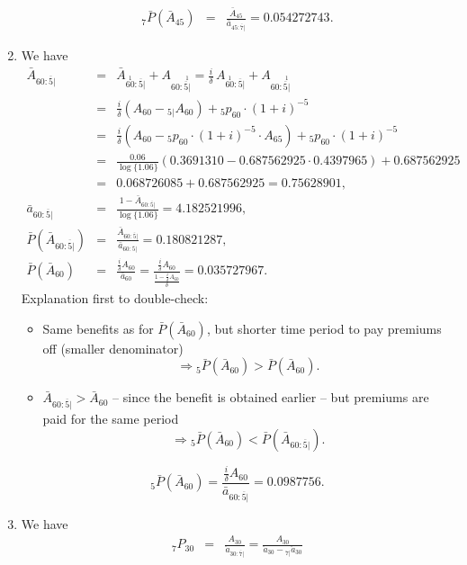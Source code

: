 \documentclass[11pt,fleqn,oneside]{book}
\begin{document}
\begin{enumerate}
\begin{eqnarray*}
{_7\bar{P}\left(\bar{A}_{45}\right)} &=& \frac{\bar{A}_{45}}{\bar{a}_{45:\overline{7}|}} = 0.054272743.
\end{eqnarray*}
\item We have
\begin{eqnarray*}
\bar{A}_{60:\overline{5}|} &=& \bar{A}_{\stackrel{1}{60}:{\overline{5}|}} + A_{60:\stackrel{1}{\overline{5}|}}
=  \frac{i}{\delta}\, A_{\stackrel{1}{60}:{\overline{5}|}} + A_{60:\stackrel{1}{\overline{5}|}}\\
&=& \frac{i}{\delta}\left(A_{60} -{_{5|}A_{60}}\right) + {_5p_{60}}\cdot (1+i)^{-5}\\
&=& \frac{i}{\delta}\left(A_{60} - {_5p_{60}}\cdot (1+i)^{-5}\cdot {A_{65}}\right) + {_5p_{60}}\cdot (1+i)^{-5} \\
&=& \frac{0.06}{\log\{1.06\}} \left(0.3691310 - 0.687562925 \cdot 0.4397965\right) + 0.687562925\\
&=& 0.068726085 + 0.687562925 = 0.75628901,\\
\bar{a}_{60:\overline{5}|} &=& \frac{1 - \bar{A}_{60:\overline{5}|} }{\log\{1.06\}} = 4.182521996,\\
\bar{P}\left(\bar{A}_{60:\overline{5}|}\right) &=& \frac{\bar{A}_{60:\overline{5}|} }{\bar{a}_{60:\overline{5}|} }=0.180821287,\\
\bar{P}\left(\bar{A}_{60}\right) &=& \frac{\frac{i}{\delta}A_{60}}{\bar{a}_{60}} = \frac{\frac{i}{\delta}A_{60}}{\frac{1 - \frac{i}{\delta}A_{60}}{\delta}} = 0.035727967. 
\end{eqnarray*}
Explanation first to double-check:
\begin{itemize}
\item Same benefits as for $\bar{P}\left(\bar{A}_{60}\right)$, but shorter time period to pay premiums off (smaller denominator)
$$
\Rightarrow {_5\bar{P}\left(\bar{A}_{60}\right)} > \bar{P}\left(\bar{A}_{60}\right).
$$
\item  $\bar{A}_{60:\overline{5}|} > \bar{A}_{60}$ -- since the benefit is obtained earlier -- but premiums are paid for the same period
$$
\Rightarrow {_5\bar{P}\left(\bar{A}_{60}\right)} < \bar{P}\left(\bar{A}_{60:\overline{5}|}\right).
$$
\end{itemize}
$$
{_5\bar{P}\left(\bar{A}_{60}\right)} = \frac{\frac{i}{\delta} A_{60}}{\bar{a}_{60:\overline{5}|}} = 0.0987756.
$$
\item We have
\begin{eqnarray*}
{_7P_{30}} &=& \frac{A_{30}}{\ddot{a}_{30:\overline{7}|}} = \frac{A_{30}}{\ddot{a}_{30} -{_{7|}\ddot{a}_{30}}}\\

\end{eqnarray*}
\end{enumerate}
\end{document}
